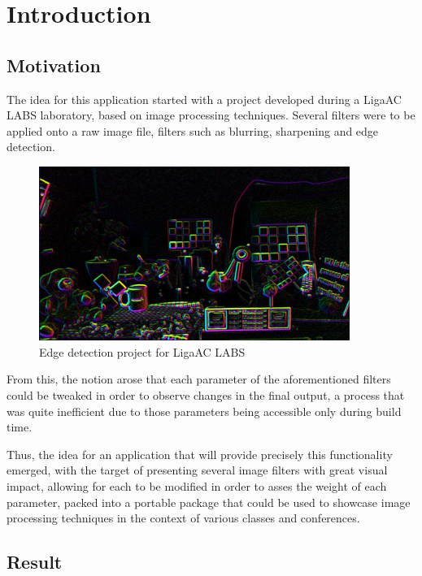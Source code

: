 \chapter{Introduction}

\section{Motivation}

The idea for this application started with a project developed during a LigaAC LABS laboratory, based on image
processing techniques. Several filters were to be applied onto a raw image file, filters such as blurring,
sharpening and edge detection.

\begin{figure}[H]
	\includegraphics[width=0.9\textwidth, height=0.6\textwidth]{resources/LABS.jpg}
	\caption{Edge detection project for LigaAC LABS}
\end{figure}

From this, the notion arose that each parameter of the aforementioned filters could be tweaked in order to
observe changes in the final output, a process that was quite inefficient due to those parameters being
accessible only during build time.

Thus, the idea for an application that will provide precisely this functionality emerged, with the target 
of presenting several image filters with great visual impact, allowing for each to be modified in order to 
asses the weight of each parameter, packed into a portable package that could be used to showcase image 
processing techniques in the context of various classes and conferences.

\section{Result}

